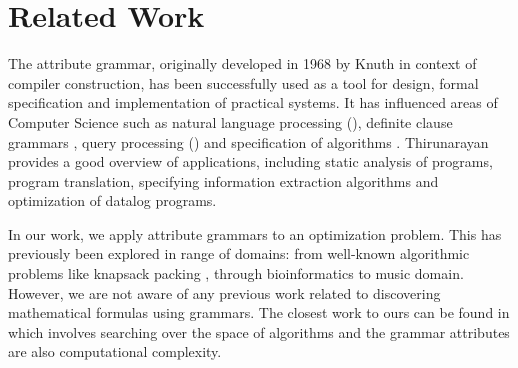 \section{Related Work} \label{relatedwork}

The attribute grammar, originally developed in 1968 by Knuth \cite{knuth1968semantics} in context of compiler
construction, has been successfully used as a tool for design, formal specification
and implementation of practical systems. It has influenced areas of
Computer Science such as natural language processing (\citealp{hafiz2011modular, starkie2002inferring}), 
definite clause grammars \cite{bratko2001prolog}, query processing (\citealp{koch2007attribute,ramakrishnan1991top}) and specification of algorithms \cite{bellanova1984examples}.
Thirunarayan \cite{thirunarayan2009attribute} provides a good overview of 
applications, including static analysis of programs, program translation, specifying information
extraction algorithms and optimization of datalog programs.

In our work, we apply attribute grammars to an optimization problem. This has previously been explored in range of domains: from well-known algorithmic problems 
like knapsack packing \cite{o2004solving}, through bioinformatics \cite{waldispuhl2002approximate} to music domain\cite{desainte1994using}.
However, we are not aware of any previous work related to discovering mathematical formulas using grammars. The closest work to ours can be found in \cite{cheung1999attribute} which involves searching
over the space of algorithms and the grammar attributes are also computational complexity.



